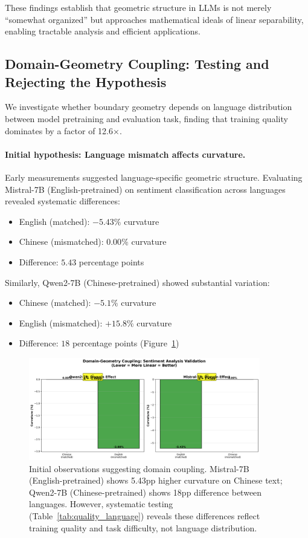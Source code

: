 \documentclass[11pt]{article}
\begin{document}
These findings establish that geometric structure in LLMs is not merely ``somewhat organized'' but approaches mathematical ideals of linear separability, enabling tractable analysis and efficient applications.

\subsection{Domain-Geometry Coupling: Testing and Rejecting the Hypothesis}
\label{sec:results-domain}

We investigate whether boundary geometry depends on language distribution between model pretraining and evaluation task, finding that training quality dominates by a factor of 12.6×.

\paragraph{Initial hypothesis: Language mismatch affects curvature.}
Early measurements suggested language-specific geometric structure. Evaluating Mistral-7B (English-pretrained) on sentiment classification across languages revealed systematic differences:
\begin{itemize}
\item English (matched): $-5.43\%$ curvature
\item Chinese (mismatched): $0.00\%$ curvature  
\item Difference: $5.43$ percentage points
\end{itemize}

Similarly, Qwen2-7B (Chinese-pretrained) showed substantial variation:
\begin{itemize}
\item Chinese (matched): $-5.1\%$ curvature
\item English (mismatched): $+15.8\%$ curvature
\item Difference: $18$ percentage points (Figure~\ref{fig:domain-coupling})
\end{itemize}

\begin{figure}[h]
\centering
\includegraphics[width=0.9\textwidth]{figures/domain_coupling_sentiment.png}
\caption{Initial observations suggesting domain coupling. Mistral-7B (English-pretrained) shows 5.43pp higher curvature on Chinese text; Qwen2-7B (Chinese-pretrained) shows 18pp difference between languages. However, systematic testing (Table~\ref{tab:quality_language}) reveals these differences reflect training quality and task difficulty, not language distribution.}
\label{fig:domain-coupling}
\end{figure}
\end{document}
